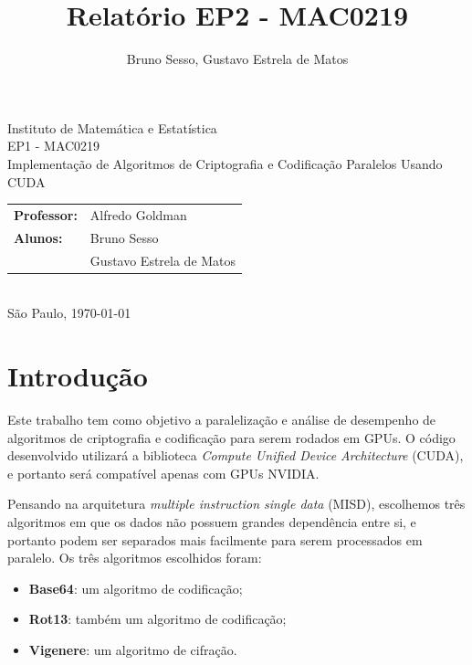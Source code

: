 \documentclass[12pt]{article}
\title{Relatório EP2 - MAC0219}
\author{Bruno Sesso, Gustavo Estrela de Matos}
\begin{document}
\doublespacing
\begin{titlepage}
    \vfill
    \begin{center}
        \vspace{0.5\textheight}
        \noindent
        Instituto de Matemática e Estatística \\
        EP1 - MAC0219 \\
        \vfill
        \noindent
        {\Large Implementação de Algoritmos de Criptografia e Codificação
                Paralelos Usando CUDA} \\
        \bigskip
        \bigskip
        \begin{tabular}{ll}
            {\bf Professor:} & {Alfredo Goldman} \\
            {\bf Alunos:}    & {Bruno Sesso} \\
                             & {Gustavo Estrela de Matos} \\
        \end{tabular} \\
        \vspace{\fill}
       \bigskip
        São Paulo, \today \\
       \bigskip
    \end{center}
\end{titlepage}

\pagebreak
\tableofcontents
\pagebreak


\newpage
\section{Introdução}
Este trabalho tem como objetivo a paralelização e análise de desempenho
de algoritmos de criptografia e codificação para serem rodados em GPUs.
O código desenvolvido utilizará a biblioteca \emph{Compute Unified 
Device Architecture} (CUDA), e portanto será compatível apenas com GPUs 
NVIDIA.

Pensando na arquitetura \emph{multiple instruction single data} (MISD), 
escolhemos três algoritmos em que os dados não possuem grandes 
dependência entre si, e portanto podem ser separados mais facilmente 
para serem processados em paralelo. Os três algoritmos escolhidos foram:
\begin{itemize}
    \item{\textbf{Base64}}: um algoritmo de codificação;
    \item{\textbf{Rot13}}: também um algoritmo de codificação;
    \item{\textbf{Vigenere}}: um algoritmo de cifração.
\end{itemize}
        
\end{document}
